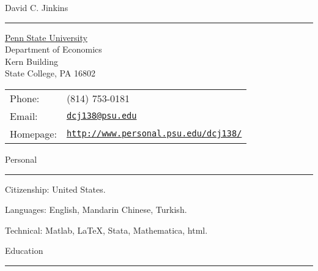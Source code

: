\documentclass[letterpaper]{article}
\def\name{David C. Jinkins}
\renewenvironment{itemize}{
  \begin{list}{}{
    \setlength{\leftmargin}{1.5em}
  }
}{
  \end{list}
}
\begin{document}
{\huge \name}
\hrule 


\vspace{4mm}

\begin{minipage}{0.45\linewidth}
  \hspace*{5mm}\href{http://www.psu.edu/}{Penn State University} \\
  \hspace*{5mm}Department of Economics \\
  \hspace*{5mm}Kern Building \\
  \hspace*{5mm}State College, PA 16802
\end{minipage}
\begin{minipage}{0.45\linewidth}
  \begin{tabular}{ll}
    Phone: & (814) 753-0181 \\
    Email: & \href{mailto:dcj138@psu.edu}{\tt dcj138@psu.edu} \\
    Homepage: & \href{http://www.personal.psu.edu/dcj138/}{\tt http://www.personal.psu.edu/dcj138/} \\
  \end{tabular}
\end{minipage}


\vspace{7mm}
{\Large Personal}
\vspace{1mm}
 \hrule

\begin{itemize}
\item Citizenship: United States.
\item Languages: English, Mandarin Chinese, Turkish.
\item Technical: Matlab, \LaTeX, Stata, Mathematica, html.
\end{itemize}

\vspace{4mm}
{\Large Education}
\vspace{1mm}
 \hrule
\end{document}
